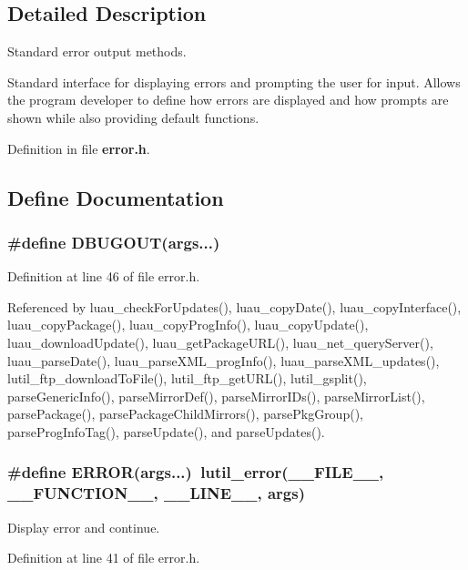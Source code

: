 \subsection{Detailed Description}
Standard error output methods. 

Standard interface for displaying errors and prompting the user for input. Allows the program developer to define how errors are displayed and how prompts are shown while also providing default functions.

Definition in file {\bf error.h}.

\subsection{Define Documentation}
\subsubsection{\setlength{\rightskip}{0pt plus 5cm}\#define DBUGOUT(args...)}\label{error_8h_a2}




Definition at line 46 of file error.h.

Referenced by luau\_\-check\-For\-Updates(), luau\_\-copy\-Date(), luau\_\-copy\-Interface(), luau\_\-copy\-Package(), luau\_\-copy\-Prog\-Info(), luau\_\-copy\-Update(), luau\_\-download\-Update(), luau\_\-get\-Package\-URL(), luau\_\-net\_\-query\-Server(), luau\_\-parse\-Date(), luau\_\-parse\-XML\_\-prog\-Info(), luau\_\-parse\-XML\_\-updates(), lutil\_\-ftp\_\-download\-To\-File(), lutil\_\-ftp\_\-get\-URL(), lutil\_\-gsplit(), parse\-Generic\-Info(), parse\-Mirror\-Def(), parse\-Mirror\-IDs(), parse\-Mirror\-List(), parse\-Package(), parse\-Package\-Child\-Mirrors(), parse\-Pkg\-Group(), parse\-Prog\-Info\-Tag(), parse\-Update(), and parse\-Updates().
\subsubsection{\setlength{\rightskip}{0pt plus 5cm}\#define ERROR(args...)\ lutil\_\-error(\_\-\_\-FILE\_\-\_\-, \_\-\_\-FUNCTION\_\-\_\-, \_\-\_\-LINE\_\-\_\-, args)}\label{error_8h_a1}


Display error and continue. 



Definition at line 41 of file error.h.

